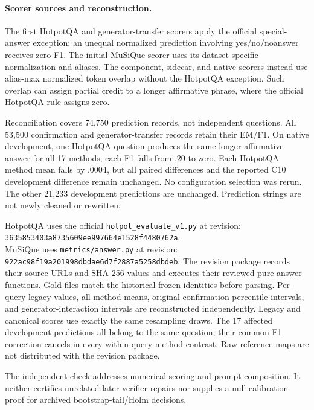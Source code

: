 \documentclass[11pt,a4paper]{article}
\begin{document}
\paragraph{Scorer sources and reconstruction.}
The first HotpotQA and generator-transfer scorers apply the official
special-answer exception: an unequal normalized prediction involving
yes/no/noanswer receives zero F1. The initial MuSiQue scorer uses its
dataset-specific normalization and aliases. The component, sidecar, and
native scorers instead use alias-max normalized token overlap without the
HotpotQA exception. Such overlap can assign partial credit to a longer
affirmative phrase, where the official HotpotQA rule assigns zero.

Reconciliation covers 74,750 prediction records, not independent questions.
All 53,500 confirmation and generator-transfer records retain their EM/F1.
On native development, one HotpotQA question produces the same longer
affirmative answer for all 17 methods; each F1 falls from $.20$ to zero.
Each HotpotQA method mean falls by $.0004$, but all paired differences and
the reported C10 development difference remain unchanged. No configuration
selection was rerun. The other 21,233 development predictions are unchanged.
Prediction strings are not newly cleaned or rewritten.

HotpotQA uses the official \texttt{hotpot\_evaluate\_v1.py} at revision:\\
\texttt{3635853403a8735609ee997664e1528f4480762a}.\\
MuSiQue uses \texttt{metrics/answer.py} at revision:\\
\texttt{922ac98f19a201998dbdae6d7f2887a5258dbdeb}.
The revision package records
their source URLs and SHA-256 values and executes their reviewed pure answer
functions. Gold files match the historical frozen identities before parsing.
Per-query legacy values, all method means, original confirmation percentile
intervals, and generator-interaction intervals are reconstructed independently.
Legacy and canonical scores use exactly the same resampling draws. The
17 affected development predictions all belong to the same question; their
common F1 correction cancels in every within-query method contrast. Raw
reference maps are not distributed with the revision package.

The independent check addresses numerical scoring and prompt composition.
It neither certifies unrelated later verifier repairs nor supplies a
null-calibration proof for archived bootstrap-tail/Holm decisions.
\end{document}
